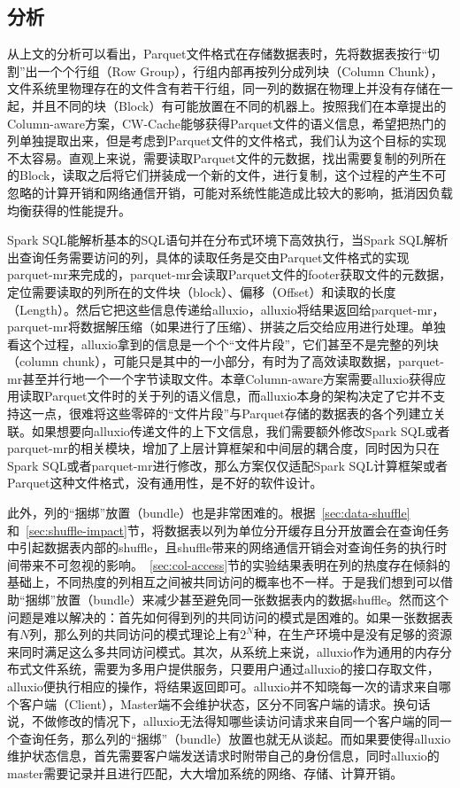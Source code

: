 \subsection{分析}
\label{subsec:simp-analysis}

\par 从上文的分析可以看出，Parquet文件格式在存储数据表时，先将数据表按行“切割”出一个个行组（Row Group），行组内部再按列分成列块（Column Chunk），文件系统里物理存在的文件含有若干行组，同一列的数据在物理上并没有存储在一起，并且不同的块（Block）有可能放置在不同的机器上。按照我们在本章提出的Column-aware方案，CW-Cache能够获得Parquet文件的语义信息，希望把热门的列单独提取出来，但是考虑到Parquet文件的文件格式，我们认为这个目标的实现不太容易。直观上来说，需要读取Parquet文件的元数据，找出需要复制的列所在的Block，读取之后将它们拼装成一个新的文件，进行复制，这个过程的产生不可忽略的计算开销和网络通信开销，可能对系统性能造成比较大的影响，抵消因负载均衡获得的性能提升。

\par Spark SQL能解析基本的SQL语句并在分布式环境下高效执行，当Spark SQL解析出查询任务需要访问的列，具体的读取任务是交由Parquet文件格式的实现parquet-mr\cite{parquet-mr}来完成的，parquet-mr会读取Parquet文件的footer获取文件的元数据，定位需要读取的列所在的文件块（block）、偏移（Offset）和读取的长度（Length）。然后它把这些信息传递给alluxio，alluxio将结果返回给parquet-mr，parquet-mr将数据解压缩（如果进行了压缩）、拼装之后交给应用进行处理。单独看这个过程，alluxio拿到的信息是一个个“文件片段”，它们甚至不是完整的列块（column chunk），可能只是其中的一小部分，有时为了高效读取数据，parquet-mr甚至并行地一个一个字节读取文件。本章Column-aware方案需要alluxio获得应用读取Parquet文件时的关于列的语义信息，而alluxio本身的架构决定了它并不支持这一点，很难将这些零碎的“文件片段”与Parquet存储的数据表的各个列建立关联。如果想要向alluxio传递文件的上下文信息，我们需要额外修改Spark SQL或者parquet-mr的相关模块，增加了上层计算框架和中间层的耦合度，同时因为只在Spark SQL或者parquet-mr进行修改，那么方案仅仅适配Spark SQL计算框架或者Parquet这种文件格式，没有通用性，是不好的软件设计。

\par 此外，列的“捆绑”放置（bundle）也是非常困难的。根据~\ref{sec:data-shuffle}和~\ref{sec:shuffle-impact}节，将数据表以列为单位分开缓存且分开放置会在查询任务中引起数据表内部的shuffle，且shuffle带来的网络通信开销会对查询任务的执行时间带来不可忽视的影响。~\ref{sec:col-access}节的实验结果表明在列的热度存在倾斜的基础上，不同热度的列相互之间被共同访问的概率也不一样。于是我们想到可以借助“捆绑”放置（bundle）来减少甚至避免同一张数据表内的数据shuffle。然而这个问题是难以解决的：首先如何得到列的共同访问的模式是困难的。如果一张数据表有$N$列，那么列的共同访问的模式理论上有$2^N$种，在生产环境中是没有足够的资源来同时满足这么多共同访问模式。其次，从系统上来说，alluxio作为通用的内存分布式文件系统，需要为多用户提供服务，只要用户通过alluxio的接口存取文件，alluxio便执行相应的操作，将结果返回即可。alluxio并不知晓每一次的请求来自哪个客户端（Client），Master端不会维护状态，区分不同客户端的请求。换句话说，不做修改的情况下，alluxio无法得知哪些读访问请求来自同一个客户端的同一个查询任务，那么列的“捆绑”（bundle）放置也就无从谈起。而如果要使得alluxio维护状态信息，首先需要客户端发送请求时附带自己的身份信息，同时alluxio的master需要记录并且进行匹配，大大增加系统的网络、存储、计算开销。

